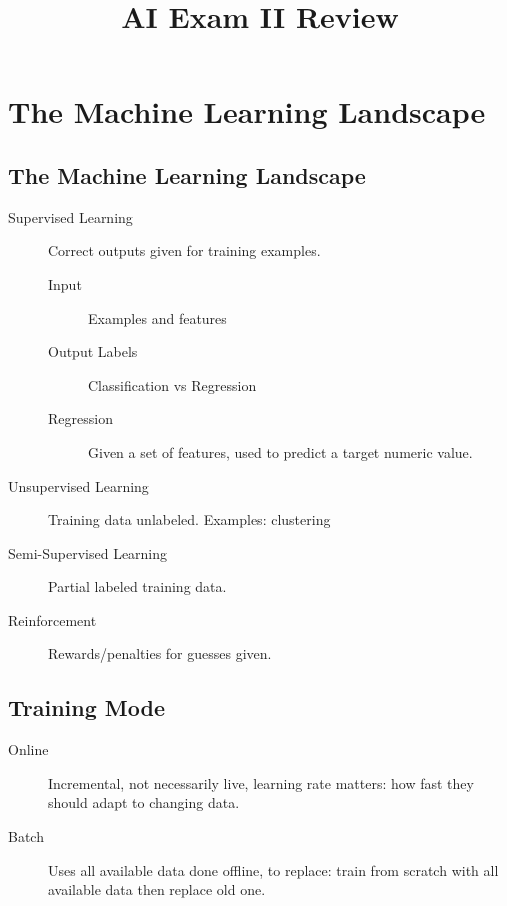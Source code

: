 \documentclass[10pt]{article}
\title{AI Exam II Review}
\begin{document}
\maketitle
\newpage
\tableofcontents
\newpage
{}

\section{The Machine Learning Landscape}%
\label{sec:the_machine_learning_landscape}

\subsection{The Machine Learning Landscape}%
\label{sub:the_machine_learning_landscape}

\begin{description}
  \item[Supervised Learning] Correct outputs given for training examples.
    \begin{description}
      \item[Input] Examples and features
      \item[Output Labels] Classification vs Regression
      \item[Regression] Given a set of features, used to predict a target numeric
        value.
    \end{description}
  \item[Unsupervised Learning] Training data unlabeled. Examples: clustering
  \item[Semi-Supervised Learning] Partial labeled training data.
  \item[Reinforcement] Rewards/penalties for guesses given.
\end{description}

\subsection{Training Mode}%
\label{sub:training_mode}

\begin{description}
  \item[Online] Incremental, not necessarily live, learning rate matters: how
    fast they should adapt to changing data.
  \item[Batch] Uses all available data done offline, to replace: train from
    scratch with all available data then replace old one.
\end{description}
\end{document}
